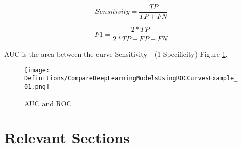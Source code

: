 \documentclass[journal,article,submit,pdftex,moreauthors]{Definitions/mdpi}
\begin{document}
\begin{equation}
	Sensitivity = \frac{TP}{TP+FN}
\end{equation}

\begin{equation}
	F1 = \frac{2*TP}{2*TP+FP+FN}
\end{equation}

AUC is the area between the curve Sensitivity - (1-Specificity) Figure \ref{auc}.
\begin{figure}
	\centering
	\texttt{[image: Definitions/CompareDeepLearningModelsUsingROCCurvesExample\_01.png]}
	\caption{AUC and ROC}
	\label{auc}
\end{figure}


\section{Relevant Sections}
\end{document}

